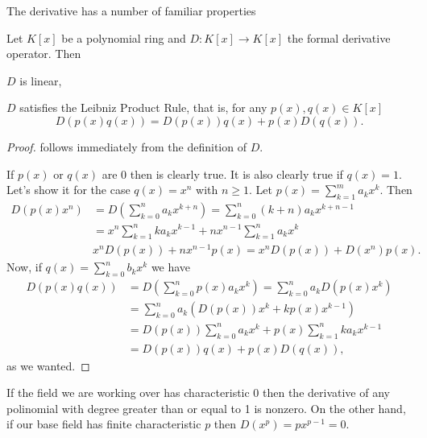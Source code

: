 \documentclass[12pt,oneside]{book}
\begin{document}
The derivative has a number of familiar properties
{\def\currentprefix{prop:properties of the derivative}
\begin{proposition}\label{prop:properties of the derivative}
	Let \( K[x] \) be a polynomial ring and \( D \colon K[x] \to K[x] \) the formal
	derivative operator. Then
	\begin{points}
	\item{} \( D \) is linear,
	\item{} \( D \) satisfies the Leibniz Product Rule, that is, for any \(
		p(x), q(x) \in K[x] \)
		\begin{equation*}
			D(p(x)q(x)) = D(p(x)) q(x) + p(x)D(q(x)).
		\end{equation*}
	\end{points}
\end{proposition}
\begin{proof}
	 follows immediately from the definition of \( D \).

	If \( p(x) \) or \( q(x) \) are 0 then  is clearly true. It is also clearly
	true if \( q(x) = 1 \). Let's show it for the case \( q(x) = x^n \) with \( n \geq 1 \).
	Let \( p(x) = \sum_{k = 1}^{m}a_k x^k  \). Then
	\begin{align*}
		D(p(x)x^n) & = D\left(\sum_{k = 0}^{n} a_k x^{k + n}\right) = \sum_{k = 0}^{n} (k +
		n)a_k x^{k+n-1} \\
							 & = x^n\sum_{k = 1}^{n}ka_k x^{k - 1} + nx^{n-1}\sum_{k = 1}^{n}a_k x^k \\
							 & x^nD(p(x)) + nx^{n-1}p(x) = x^nD(p(x)) + D(x^n)p(x).
	\end{align*}
	Now, if \( q(x) = \sum_{k = 0}^{n}b_kx^k  \) we have
	\begin{align*}
		D(p(x)q(x)) & = D\left(\sum_{k = 0}^{n} p(x)a_k x^k\right) = \sum_{k = 0}^{n} a_k
		D(p(x)x^k) \\
								& = \sum_{k = 0}^{n} a_k\left(D(p(x))x^k + kp(x)x^{k-1}\right) \\
								& = D(p(x))\sum_{k = 0}^{n}a_k x^k + p(x)\sum_{k = 1}^{n} ka_kx^{k-1} \\
								& = D(p(x))q(x) + p(x)D(q(x)),
	\end{align*}
	as we wanted.
\end{proof}
}
If the field we are working over has characteristic 0 then the derivative of any
polinomial with degree greater than or equal to 1 is nonzero. On the other hand, if our
base field has finite characteristic \( p \) then \( D(x^p) = px^{p-1} = 0 \).
\end{document}
